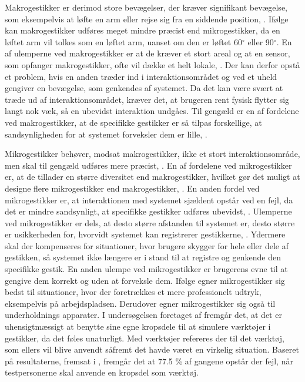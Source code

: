 Makrogestikker er derimod store bevægelser, der kræver signifikant bevægelse, som eksempelvis at løfte en arm eller rejse sig fra en siddende position, \parencite[s. 6]{PDF:UsabilityofMicroVsMacroGestures}. Ifølge \textcite[s. 9]{PDF:UsabilityofMicroVsMacroGestures} kan makrogestikker udføres meget mindre præcist end mikrogestikker, da en løftet arm vil tolkes som en løftet arm, uanset om den er løftet 60$^{\circ}$ eller 90$^{\circ}$. En af ulemperne ved makrogestikker er at de kræver et stort areal og at en sensor, som opfanger makrogestikker, ofte vil dække et helt lokale, \parencite[s. 9]{PDF:UsabilityofMicroVsMacroGestures}. Der kan derfor opstå et problem, hvis en anden træder ind i interaktionsområdet og ved et uheld gengiver en bevægelse, som genkendes af systemet. Da det kan være svært at træde ud af interaktionsområdet, kræver det, at brugeren rent fysisk flytter sig langt nok væk, så en ubevidst interaktion undgåes. Til gengæld er en af fordelene ved makrogestikker, at de specifikke gestikker er så tilpas forskellige, at sandsynligheden for at systemet forveksler dem er lille, \parencite[s. 9]{PDF:UsabilityofMicroVsMacroGestures}.  

Mikrogestikker behøver, modsat makrogestikker, ikke et stort interaktionsområde, men skal til gengæld udføres mere præcist, \parencite[s. 10]{PDF:UsabilityofMicroVsMacroGestures}. En af fordelene ved mikrogestikker er, at de tillader en større diversitet end makrogestikker, hvilket gør det muligt at designe flere mikrogestikker end makrogestikker, \parencite[s. 10]{PDF:UsabilityofMicroVsMacroGestures}. En anden fordel ved mikrogestikker er, at interaktionen med systemet sjældent opstår ved en fejl, da det er mindre sandsynligt, at specifikke gestikker udføres ubevidst, \parencite[s. 10]{PDF:UsabilityofMicroVsMacroGestures}. Ulemperne ved mikrogestikker er dels, at desto større afstanden til systemet er, desto større er usikkerheden for, hvorvidt systemet kan registrerer gestikkerne, \parencite[s. 10]{PDF:UsabilityofMicroVsMacroGestures}. Ydermere skal der kompenseres for situationer, hvor brugere skygger for hele eller dele af gestikken, så systemet ikke længere er i stand til at registre og genkende den specifikke gestik. En anden ulempe ved mikrogestikker er brugerens evne til at gengive dem korrekt og uden at forveksle dem. Ifølge \textcite[s. 10]{PDF:UsabilityofMicroVsMacroGestures} egner mikrogestikker sig bedst til situationer, hvor der foretrækkes et mere professionelt udtryk, eksempelvis på arbejdspladsen. Derudover egner mikrogestikker sig også til underholdnings apparater.\blankline
%
I undersøgelsen foretaget af \textcite[s. 823]{PDF:UnderstandingNaturalness} fremgår det, at det er uhensigtmæssigt at benytte sine egne kropsdele til at simulere værktøjer i gestikker, da det føles unaturligt. Med værktøjer refereres der til det værktøj, som ellers vil blive anvendt såfremt det havde været en virkelig situation. Baseret på resultaterne, fremsat i \textcite[s. 823]{PDF:UnderstandingNaturalness}, fremgår det at 77.5 \% af gangene opstår der fejl, når testpersonerne skal anvende en kropsdel som værktøj.


